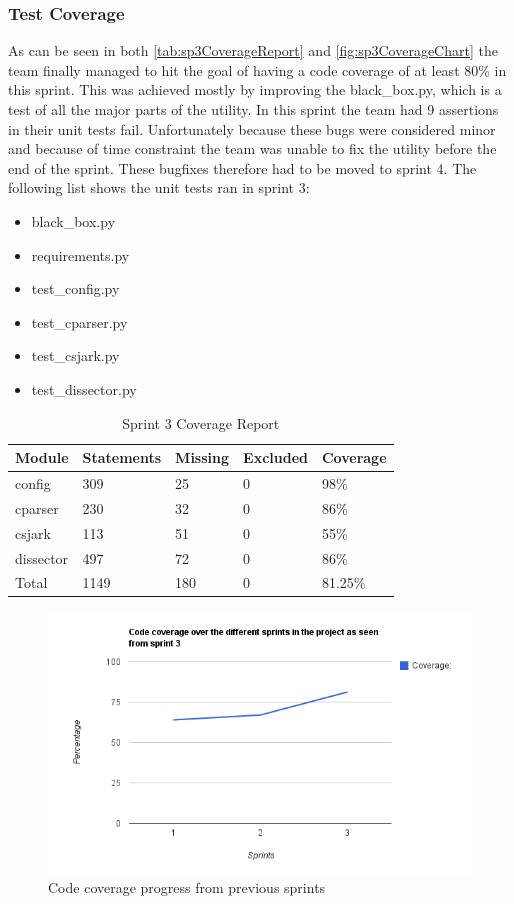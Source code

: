 \subsubsection{Test Coverage}

As can be seen in both \autoref{tab:sp3CoverageReport} and \autoref{fig:sp3CoverageChart} the team finally managed to hit the goal of having a code coverage of at least 80\% in this sprint. This was achieved mostly by improving the black\_box.py, which is a test of all the major parts of the \gls{utility}. In this sprint the team had 9 assertions in their unit tests fail. Unfortunately because these bugs were considered minor and because of time constraint the team was unable to fix the \gls{utility} before the end of the sprint. These bugfixes therefore had to be moved to sprint 4. The following list shows the unit tests ran in sprint 3:
\begin{itemize}
	\item black\_box.py
	\item requirements.py
	\item test\_config.py
	\item test\_cparser.py
	\item test\_csjark.py
	\item test\_dissector.py
\end{itemize}

\begin{table}[!htb]\footnotesize\center
	\caption{Sprint 3 Coverage Report\label{tab:sp3CoverageReport}}
	\begin{tabular}{l l l l l}
		\toprule
		Module & Statements & Missing & Excluded & Coverage\\
		\midrule
		config & 309 & 25 & 0 & 98\%\ \\
		cparser & 230 & 32 & 0 & 86\%\ \\
		csjark & 113 & 51 & 0 & 55\%\ \\
		dissector & 497 & 72 & 0 & 86\%\ \\
		Total & 1149 & 180  & 0 & 81.25\%\ \\
		\bottomrule
	\end{tabular}
\end{table}

\begin{figure}[ht]
	\center
	\includegraphics[width=\textwidth]{./sprints/img/sprint3_code_coverage_chart.png}
	\caption{Code coverage progress from previous sprints\label{fig:sp3CoverageChart}}
\end{figure}


